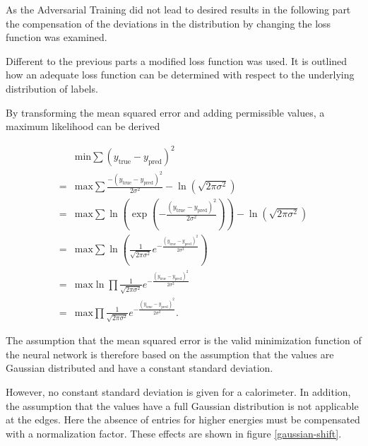 \documentclass[12pt, a4paper]{thesis}
\begin{document}
As the Adversarial Training did not lead to desired results in the
following part the compensation of the deviations in the distribution
by changing the loss function was examined.

Different to the previous parts a modified loss function was used. It
is outlined how an adequate loss function can be determined with
respect to the underlying distribution of labels.

By transforming the mean squared error and adding permissible values,
a maximum likelihood can be derived

\begin{align}
    &\text{min} \sum (y_{\text{true}}-y_{\text{pred}})^2
  \\ =&\text{max} \sum\frac{-(y_{\text{true}}-y_{\text{pred}})^2}{2
    \sigma^2} - \ln(\sqrt{2\pi \sigma^2}) \\ = &\text{max} \sum
  \ln(\exp(-\frac{(y_{\text{true}}-y_{\text{pred}})^2}{2 \sigma^2})) -
  \ln(\sqrt{2\pi \sigma^2}) \\ = &\text{max} \sum \ln(
  \frac{1}{\sqrt{2\pi \sigma^2}}
  e^{-\frac{(y_{\text{true}}-y_{\text{pred}})^2}{2 \sigma^2}}) \\ =
  &\text{max} \ln \prod \frac{1}{\sqrt{2\pi \sigma^2}}
  e^{-\frac{(y_{\text{true}}-y_{\text{pred}})^2}{2 \sigma^2}}\\ =
  &\text{max} \prod \frac{1}{\sqrt{2\pi \sigma^2}}
  e^{-\frac{(y_{\text{true}}-y_{\text{pred}})^2}{2 \sigma^2}}.
\end{align}

The assumption that the mean squared error is the valid minimization
function of the neural network is therefore based on the assumption
that the values are Gaussian distributed and have a constant standard
deviation.

However, no constant standard deviation is given for a calorimeter. In
addition, the assumption that the values have a full Gaussian
distribution is not applicable at the edges. Here the absence of
entries for higher energies must be compensated with a normalization
factor. These effects are shown in figure \ref{gaussian-shift}.
\end{document}
